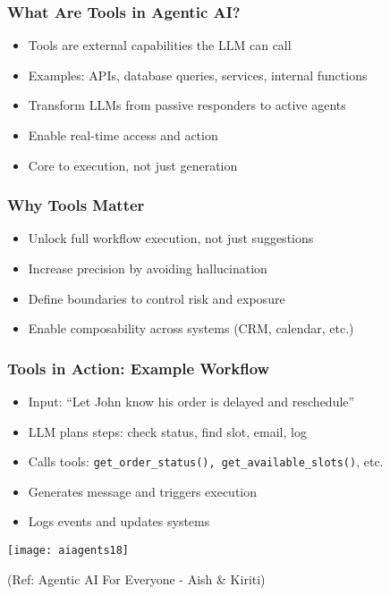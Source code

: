 \begin{frame}[fragile]\frametitle{What Are Tools in Agentic AI?}
      \begin{itemize}
        \item Tools are external capabilities the LLM can call
        \item Examples: APIs, database queries, services, internal functions
        \item Transform LLMs from passive responders to active agents
        \item Enable real-time access and action
        \item Core to execution, not just generation
      \end{itemize}
\end{frame}

\begin{frame}[fragile]\frametitle{Why Tools Matter}
      \begin{itemize}
        \item Unlock full workflow execution, not just suggestions
        \item Increase precision by avoiding hallucination
        \item Define boundaries to control risk and exposure
        \item Enable composability across systems (CRM, calendar, etc.)
      \end{itemize}
\end{frame}

\begin{frame}[fragile]\frametitle{Tools in Action: Example Workflow}
      \begin{itemize}
        \item Input: ``Let John know his order is delayed and reschedule''
        \item LLM plans steps: check status, find slot, email, log
        \item Calls tools: \lstinline|get_order_status(), get_available_slots()|, etc.
        \item Generates message and triggers execution
        \item Logs events and updates systems
      \end{itemize}
	  
		\begin{center}
		\texttt{[image: aiagents18]}
		
		{\tiny (Ref: Agentic AI For Everyone - Aish \& Kiriti)}
		\end{center}	  
\end{frame}

